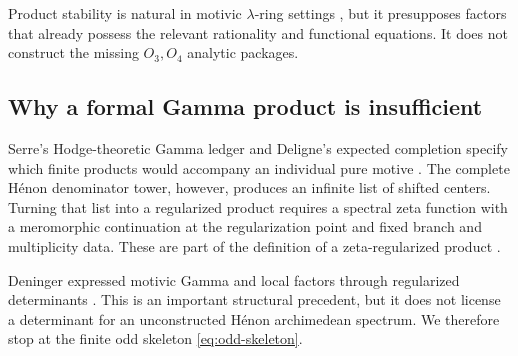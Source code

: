 Product stability is natural in motivic \(\lambda\)-ring settings
\cite[Proposition 6.1]{Heinloth2007}, but it presupposes factors that
already possess the relevant rationality and functional equations.  It
does not construct the missing \(O_3,O_4\) analytic packages.

\subsection{Why a formal Gamma product is insufficient}

Serre's Hodge-theoretic Gamma ledger and Deligne's expected completion
specify which finite products would accompany an individual pure motive
\cite{Serre1970,Deligne1979}.  The complete H\'enon denominator tower,
however, produces an infinite list of shifted centers.  Turning that list
into a regularized product requires a spectral zeta function with a
meromorphic continuation at the regularization point and fixed branch and
multiplicity data.  These are part of the definition of a zeta-regularized
product \cite{Quine1993}.

Deninger expressed motivic Gamma and local factors through regularized
determinants \cite{Deninger1991,Deninger1992}.  This is an important
structural precedent, but it does not license a determinant for an
unconstructed H\'enon archimedean spectrum.  We therefore stop at the
finite odd skeleton \eqref{eq:odd-skeleton}.
